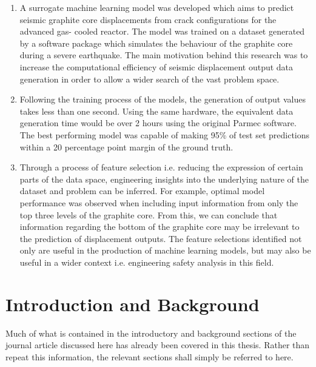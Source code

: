 \begin{enumerate}
	
\item A surrogate machine learning model was developed
which aims to predict seismic graphite core displacements from crack configurations for the advanced gas-
cooled reactor. The model was trained on a dataset generated by a software package which simulates the behaviour of the graphite core during a severe earthquake.
The main motivation behind this research was to increase the computational efficiency of seismic displacement output data generation in order to allow a wider
search of the vast problem space. 

\item Following the training process of the models, the generation of output values takes less than one second. Using the same hardware, the equivalent data generation time would be over
2 hours using the original Parmec software.
The best performing model was capable of making
95\% of test set predictions within a 20 percentage point
margin of the ground truth. 

\item Through a process of feature selection i.e. reducing the expression of certain parts of the data space, engineering insights into the underlying nature of the dataset and problem can be inferred. For example, optimal model performance was observed when including input information from only the top three levels of the graphite core. From this, we can conclude that information regarding the bottom of the graphite core may be irrelevant to the prediction of displacement outputs. The feature selections identified not only are useful in the production of machine learning models, but may also be useful in a wider context i.e. engineering safety analysis in this field.


\end{enumerate}


\section{Introduction and Background}

Much of what is contained in the introductory and background sections of the journal article discussed here has already been covered in this thesis. Rather than repeat this information, the relevant sections shall simply be referred to here.


